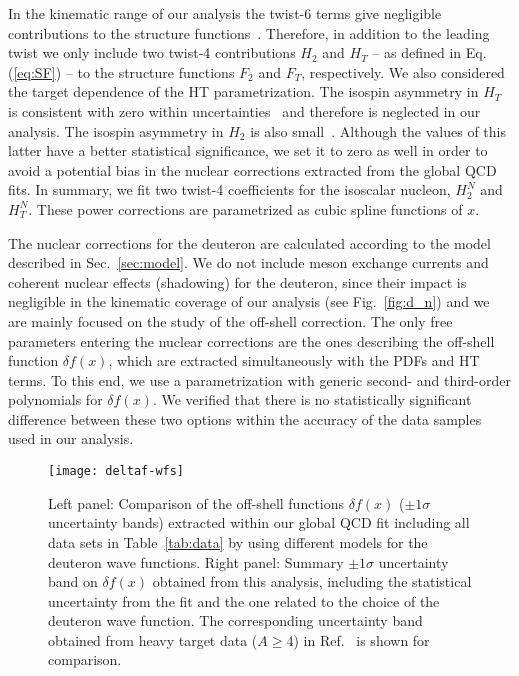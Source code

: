 \documentclass[%
      aps,
      prd,
      floatfix,
      preprintnumbers,
      preprint,
      showpacs,
      nofootinbib,
      tightenlines,
      amssymb,
      amsmath
]{revtex4-1}
\newcommand{\eq}[1]{Eq.(\ref{#1})}
\begin{document}
In the kinematic range of our analysis the twist-6 terms give negligible contributions to 
the structure functions~\cite{Alekhin:2007fh}.   
Therefore, in addition to the leading twist we only include two twist-4 contributions 
$H_2$ and $H_T$ -- as defined in \eq{eq:SF} -- to the structure functions $F_2$ and $F_T$, respectively. 
We also considered the target dependence of the HT parametrization. The isospin asymmetry 
in $H_T$ is consistent with zero within uncertainties~\cite{Alekhin:2003qq} and therefore 
is neglected in our analysis. 
The isospin asymmetry in $H_2$ is also small~\cite{Alekhin:2003qq}. 
Although the values of this latter have a better statistical significance, we set it to zero as well 
in order to avoid a potential bias in the nuclear corrections extracted from 
the global QCD fits.  
In summary, we fit two twist-4 coefficients for the isoscalar nucleon, $H_2^N$ and $H_T^N$. 
These power corrections are parametrized as cubic spline functions of $x$. 
 
The nuclear corrections for the deuteron are calculated according to the model described in 
Sec.~\ref{sec:model}. We do not include meson exchange currents and coherent nuclear effects
(shadowing) for the deuteron, since their impact 
is negligible in the kinematic coverage of our analysis (see Fig.~\ref{fig:d_n}) and we 
are mainly focused on the study of the off-shell correction. 
The only free parameters entering the nuclear corrections are the ones describing the 
off-shell function $\delta f(x)$, which are extracted simultaneously with the PDFs and 
HT terms. To this end, we use a parametrization with generic second- and third-order polynomials 
for $\delta f(x)$. We verified that there is no statistically significant difference between these two 
options within the accuracy of the data samples used in our analysis. 


\begin{figure}[htb] %
\begin{center}
\texttt{[image: deltaf-wfs]}
\caption{%
Left panel: Comparison of the off-shell functions $\delta f(x)$ ($\pm 1 \sigma$ uncertainty bands) 
extracted within our global QCD fit including all data sets in Table~\ref{tab:data} by 
using different models for the deuteron wave functions. 
Right panel: Summary $\pm 1 \sigma$ uncertainty band on $\delta f(x)$ obtained from this analysis,   
including the statistical uncertainty from the fit and the one related 
to the choice of the deuteron wave function. 
The corresponding uncertainty band obtained from heavy target data ($A \geq 4$) in Ref.~\cite{KP04} is 
shown for comparison. 
}
\label{fig:dfwf}
\end{center}
\end{figure}
\end{document}
